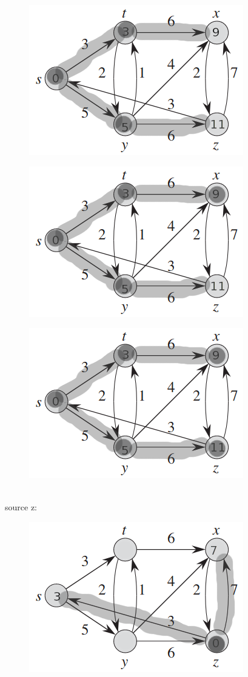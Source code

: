 \documentclass[]{memoir}
\begin{document}
\begin{enumerate}
\begin{figure}[h]
\end{figure}
\begin{figure}[h]
	\centering
	\includegraphics[scale=.7]{s3}
\end{figure}
\begin{figure}[h]
	\centering
	\includegraphics[scale=.7]{s4}
\end{figure}
\begin{figure}[h]
	\centering
	\includegraphics[scale=.7]{s5}
\end{figure}
\pagebreak\\
source z:
\begin{figure}[h]
	\centering
	\includegraphics[scale=.7]{z1}

\end{figure}
\end{enumerate}
\end{document}
